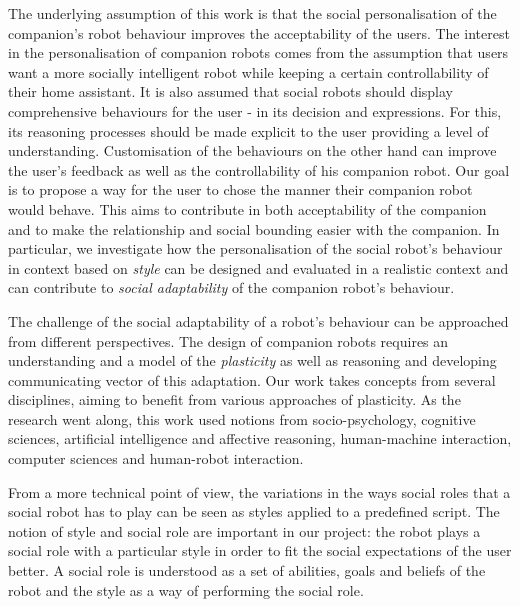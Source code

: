 \documentclass[a4paper,twocolumn]{svjour3}
\begin{document}
The underlying assumption of this work is that the social personalisation of the companion's robot behaviour improves the acceptability of the users.
The interest in the personalisation of companion robots comes from the assumption that users want a more socially intelligent robot while keeping a certain controllability of their home assistant.
It is also assumed that social robots should display comprehensive behaviours for the user - in its decision and expressions.
For this, its reasoning processes should be made explicit to the user providing a level of understanding. 
Customisation of the behaviours on the other hand can improve the user's feedback as well as the controllability of his companion robot.
Our goal is to propose a way for the user to chose the manner their companion robot would behave. 
This aims to contribute in both acceptability of the companion and to make the relationship and social bounding easier with the companion. 
In particular, we investigate how the personalisation of the social robot's behaviour in context based on \textit{style} can be designed and evaluated in a realistic context and can contribute to \textit{social adaptability} of the companion robot's behaviour.

The challenge of the social adaptability of a robot's behaviour can be approached from different perspectives. 
The design of companion robots requires an understanding and a model of the \textit{plasticity} as well as reasoning and developing communicating vector of this adaptation. 
Our work takes concepts from several disciplines, aiming to benefit from various approaches of plasticity.
As the research went along, this work used notions from socio-psychology, cognitive sciences, artificial intelligence and affective reasoning, human-machine interaction, computer sciences and human-robot interaction.

From a more technical point of view, the variations in the ways social roles that a social robot  has to play can be seen as styles applied to a predefined script.
The notion of style and social role are important in our project: the robot plays a social role with a particular style in order to fit  the social expectations of the user better.
A social role is understood as a set of abilities, goals and beliefs of the robot and the style as a way of performing the social role.


\end{document}

